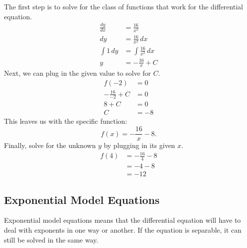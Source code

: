 \documentclass[12pt]{article}
\begin{document}
                The first step is to solve for the class of functions that work for the differential equation.
                \begin{align*}
                    \frac{dy}{dx} &= \frac{16}{x^2} \\[6pt]
                    dy &= \frac{16}{x^2} \, dx \\[6pt]
                    \int 1 \, dy &= \int \frac{16}{x^2} \, dx \\[6pt]
                    y &= -\frac{16}{x} + C
                \end{align*}
                Next, we can plug in the given value to solve for $C$.
                \begin{align*}
                    f(-2) &= 0 \\
                    -\frac{16}{-2} + C &= 0 \\[6pt]
                    8 + C &= 0 \\
                    C &= -8
                \end{align*}
                This leaves us with the specific function:
                \[ f(x) = -\frac{16}{x} - 8. \]
                Finally, solve for the unknown $y$ by plugging in its given $x$.
                \begin{align*}
                    f(4) &= -\frac{16}{4} - 8 \\[6pt]
                    &= -4 - 8 \\
                    &= -12
                \end{align*}

        \subsection{Exponential Model Equations}
            Exponential model equations means that the differential equation will have to deal with exponents in one way or another. If the equation is separable, it can still be solved in the same way.
\end{document}
